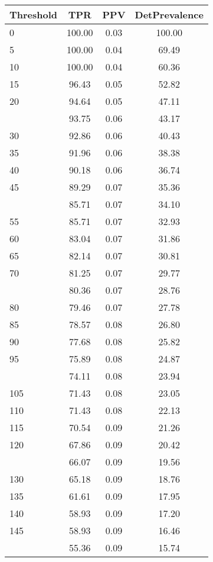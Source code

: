 \begin{table}[ht]
\centering
\begin{tabular}{lccc}
  \toprule
Threshold & TPR & PPV & DetPrevalence \\ 
  \midrule
0 & 100.00 & 0.03 & 100.00 \\ 
  5 & 100.00 & 0.04 & 69.49 \\ 
  10 & 100.00 & 0.04 & 60.36 \\ 
  15 & 96.43 & 0.05 & 52.82 \\ 
  20 & 94.64 & 0.05 & 47.11 \\ 
   \addlinespace
25 & 93.75 & 0.06 & 43.17 \\ 
  30 & 92.86 & 0.06 & 40.43 \\ 
  35 & 91.96 & 0.06 & 38.38 \\ 
  40 & 90.18 & 0.06 & 36.74 \\ 
  45 & 89.29 & 0.07 & 35.36 \\ 
   \addlinespace
50 & 85.71 & 0.07 & 34.10 \\ 
  55 & 85.71 & 0.07 & 32.93 \\ 
  60 & 83.04 & 0.07 & 31.86 \\ 
  65 & 82.14 & 0.07 & 30.81 \\ 
  70 & 81.25 & 0.07 & 29.77 \\ 
   \addlinespace
75 & 80.36 & 0.07 & 28.76 \\ 
  80 & 79.46 & 0.07 & 27.78 \\ 
  85 & 78.57 & 0.08 & 26.80 \\ 
  90 & 77.68 & 0.08 & 25.82 \\ 
  95 & 75.89 & 0.08 & 24.87 \\ 
   \addlinespace
100 & 74.11 & 0.08 & 23.94 \\ 
  105 & 71.43 & 0.08 & 23.05 \\ 
  110 & 71.43 & 0.08 & 22.13 \\ 
  115 & 70.54 & 0.09 & 21.26 \\ 
  120 & 67.86 & 0.09 & 20.42 \\ 
   \addlinespace
125 & 66.07 & 0.09 & 19.56 \\ 
  130 & 65.18 & 0.09 & 18.76 \\ 
  135 & 61.61 & 0.09 & 17.95 \\ 
  140 & 58.93 & 0.09 & 17.20 \\ 
  145 & 58.93 & 0.09 & 16.46 \\ 
   \addlinespace
150 & 55.36 & 0.09 & 15.74 \\ 

\end{tabular}
\end{table}
